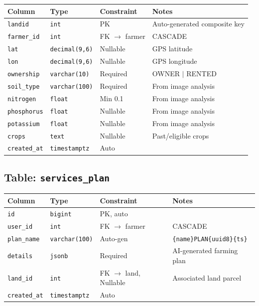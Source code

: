 \documentclass[11pt,a4paper]{article}
\begin{document}
\begin{table}[H]
\centering
\begin{tabularx}{\textwidth}{l l l X}
\toprule
\textbf{Column} & \textbf{Type} & \textbf{Constraint} & \textbf{Notes} \\
\midrule
\texttt{landid}     & \texttt{int}           & PK          & Auto-generated composite key \\
\texttt{farmer\_id} & \texttt{int}           & FK $\to$ farmer & CASCADE \\
\texttt{lat}        & \texttt{decimal(9,6)}  & Nullable    & GPS latitude \\
\texttt{lon}        & \texttt{decimal(9,6)}  & Nullable    & GPS longitude \\
\texttt{ownership}  & \texttt{varchar(10)}   & Required    & OWNER $|$ RENTED \\
\texttt{soil\_type} & \texttt{varchar(100)}  & Required    & From image analysis \\
\texttt{nitrogen}   & \texttt{float}         & Min 0.1     & From image analysis \\
\texttt{phosphorus} & \texttt{float}         & Nullable    & From image analysis \\
\texttt{potassium}  & \texttt{float}         & Nullable    & From image analysis \\
\texttt{crops}      & \texttt{text}          & Nullable    & Past/eligible crops \\
\texttt{created\_at} & \texttt{timestamptz}  & Auto        & \\
\bottomrule
\end{tabularx}
\end{table}

\subsection{Table: \texttt{services\_plan}}

\begin{table}[H]
\centering
\begin{tabularx}{\textwidth}{l l l X}
\toprule
\textbf{Column} & \textbf{Type} & \textbf{Constraint} & \textbf{Notes} \\
\midrule
\texttt{id}          & \texttt{bigint}       & PK, auto    & \\
\texttt{user\_id}    & \texttt{int}          & FK $\to$ farmer & CASCADE \\
\texttt{plan\_name}  & \texttt{varchar(100)} & Auto-gen    & \texttt{\{name\}PLAN\{uuid8\}\{ts\}} \\
\texttt{details}     & \texttt{jsonb}        & Required    & AI-generated farming plan \\
\texttt{land\_id}    & \texttt{int}          & FK $\to$ land, Nullable & Associated land parcel \\
\texttt{created\_at} & \texttt{timestamptz}  & Auto        & \\
\bottomrule
\end{tabularx}
\end{table}
\end{document}
